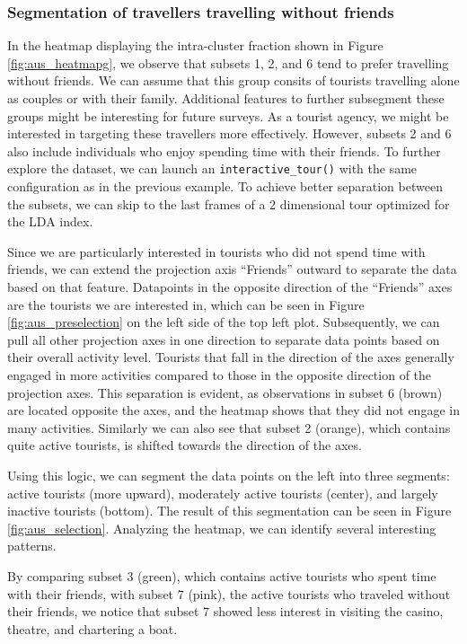 \documentclass[article]{ajs}
\begin{document}
\subsubsection{Segmentation of travellers travelling without friends}

In the heatmap displaying the intra-cluster fraction shown in Figure \ref{fig:aus_heatmapg}, we observe that subsets 1, 2, and 6 tend to prefer travelling without friends. We can assume that this group consits of tourists travelling alone as couples or with their family. Additional features to further subsegment these groups might be interesting for future surveys. As a tourist agency, we might be interested in targeting these travellers more effectively. However, subsets 2 and 6 also include individuals who enjoy spending time with their friends. To further explore the dataset, we can launch an \texttt{interactive\_tour()} with the same configuration as in the previous example. To achieve better separation between the subsets, we can skip to the last frames of a 2 dimensional tour optimized for the LDA index. 

Since we are particularly interested in tourists who did not spend time with friends, we can extend the projection axis ``Friends'' outward to separate the data based on that feature. Datapoints in the opposite direction of the ``Friends'' axes are the tourists we are interested in, which can be seen in Figure \ref{fig:aus_preselection} on the left side of the top left plot. Subsequently, we can pull all other projection axes in one direction to separate data points based on their overall activity level. Tourists that fall in the direction of the axes generally engaged in more activities compared to those in the opposite direction of the projection axes. This separation is evident, as observations in subset 6 (brown) are located opposite the axes, and the heatmap shows that they did not engage in many activities. Similarly we can also see that subset 2 (orange), which contains quite active tourists, is shifted towards the direction of the axes.

Using this logic, we can segment the data points on the left into three segments: active tourists (more upward), moderately active tourists (center), and largely inactive tourists (bottom). The result of this segmentation can be seen in Figure \ref{fig:aus_selection}. Analyzing the heatmap, we can identify several interesting patterns.

By comparing subset 3 (green), which contains active tourists who spent time with their friends, with subset 7 (pink), the active tourists who traveled without their friends, we notice that subset 7 showed less interest in visiting the casino, theatre, and chartering a boat.
\end{document}
